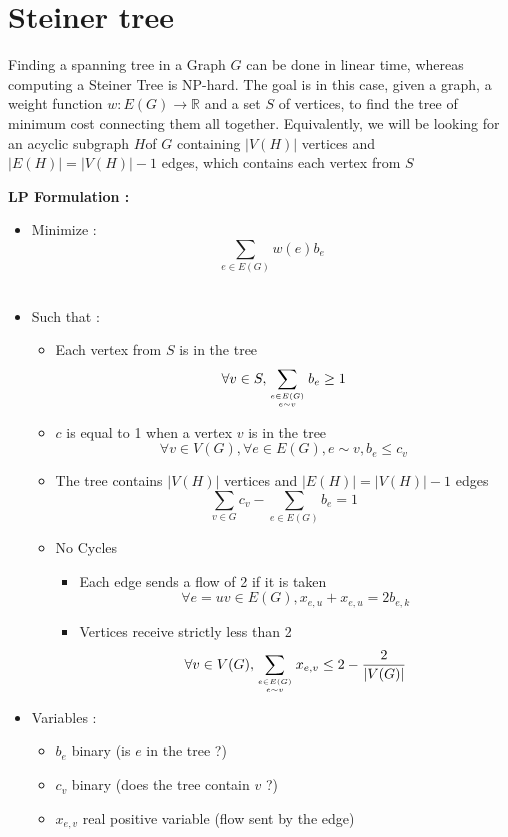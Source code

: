\section{Steiner tree}
Finding  a spanning tree  in a Graph $G$ can be done in linear time, whereas computing a Steiner Tree is NP-hard. The goal is in this case, given a graph, a weight function $w:E(G)\rightarrow \mathbb R$ and a set $S$ of vertices, to find the tree of minimum cost connecting them all together. Equivalently, we will be looking for an acyclic subgraph $H$of $G$ containing $|V(H)|$ vertices and $|E(H)|=|V(H)|-1$ edges, which contains each vertex from $S$

{\bf LP Formulation :}
\begin{itemize}
\item Minimize : $$\sum_{e\in E(G)}w(e) b_e$$\\
\item Such that :
  \begin{itemize}
  \item Each vertex from $S$ is in the tree
    $$\forall v \in S, \sum_{e\in E(G)\atop e\sim v}b_e \geq 1$$
  \item $c$ is equal to 1 when a vertex $v$ is in the tree
    $$\forall v \in V(G), \forall e\in E(G), e\sim v, b_e\leq c_v$$
  \item The tree contains $|V(H)|$ vertices and $|E(H)|=|V(H)|-1$ edges
    $$\sum_{v\in G}c_v - \sum_{e\in E(G)}b_e = 1$$
  \item No Cycles
    \begin{itemize}
    \item Each edge sends a flow of 2 if it is taken
      $$\forall e=uv\in E(G), x_{e,u} + x_{e,u} = 2b_{e,k}$$
    \item Vertices receive strictly less than 2
      $$\forall v\in V(G), \sum_{e\in E(G)\atop e\sim v}x_{e,v}\leq 2-\frac 2 {|V(G)|}$$
    \end{itemize}

  \end{itemize}
\item Variables :
  \begin{itemize}
  \item $b_e$  binary (is $e$ in the tree ?)
  \item $c_v$ binary (does the tree contain $v$ ?)
  \item $x_{e,v}$ real positive variable (flow sent by the edge)
  \end{itemize}
\end{itemize}


